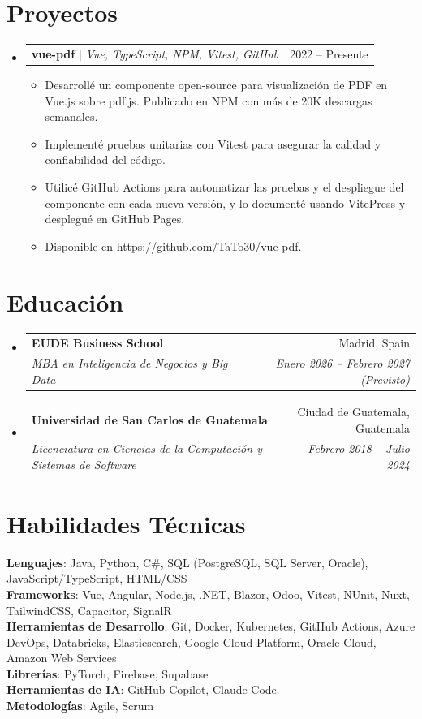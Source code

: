 \documentclass[letterpaper,11pt]{article}
\makeatletter
\newcommand{\resumeItem}[1]{
  \item\small{
    {#1 \vspace{-2pt}}
  }
}
\newcommand{\resumeSubheading}[4]{
  \vspace{-2pt}\item
    \begin{tabular*}{0.97\textwidth}[t]{l@{\extracolsep{\fill}}r}
      \textbf{#1} & #2 \\
      \textit{\small#3} & \textit{\small #4} \\
    \end{tabular*}\vspace{-7pt}
}
\newcommand{\resumeProjectHeading}[2]{
    \item
    \begin{tabular*}{0.97\textwidth}{l@{\extracolsep{\fill}}r}
      \small#1 & #2 \\
    \end{tabular*}\vspace{-7pt}
}
\newcommand{\resumeSubHeadingListStart}{\begin{itemize}[leftmargin=0.15in, label={}]}
\newcommand{\resumeSubHeadingListEnd}{\end{itemize}}
\newcommand{\resumeItemListStart}{\begin{itemize}}
\newcommand{\resumeItemListEnd}{\end{itemize}\vspace{-5pt}}
\makeatother
\begin{document}
\section{Proyectos}
    \resumeSubHeadingListStart
      \resumeProjectHeading
          {\textbf{vue-pdf} $|$ \emph{Vue, TypeScript, NPM, Vitest, GitHub}}{2022 -- Presente}
          \resumeItemListStart
            \resumeItem{Desarrollé un componente open-source para visualización de PDF en Vue.js sobre pdf.js. Publicado en NPM con más de 20K descargas semanales.}
            \resumeItem{Implementé pruebas unitarias con Vitest para asegurar la calidad y confiabilidad del código.}
            \resumeItem{Utilicé GitHub Actions para automatizar las pruebas y el despliegue del componente con cada nueva versión, y lo documenté usando VitePress y desplegué en GitHub Pages.}
            \resumeItem{Disponible en \href{https://github.com/TaTo30/vue-pdf}{https://github.com/TaTo30/vue-pdf}.}
            \resumeItemListEnd
    \resumeSubHeadingListEnd

\section{Educación}
  \resumeSubHeadingListStart
    \resumeSubheading
      {EUDE Business School}{Madrid, Spain}
      {MBA en Inteligencia de Negocios y Big Data}{Enero 2026 -- Febrero 2027 (Previsto)}
    \resumeSubheading
      {Universidad de San Carlos de Guatemala}{Ciudad de Guatemala, Guatemala}
      {Licenciatura en Ciencias de la Computación y Sistemas de Software}{Febrero 2018 -- Julio 2024}
  \resumeSubHeadingListEnd


\section{Habilidades Técnicas}
 \begin{itemize}[leftmargin=0.15in, label={}]
    \small{\item{
    \textbf{Lenguajes}{: Java, Python, C\#, SQL (PostgreSQL, SQL Server, Oracle), JavaScript/TypeScript, HTML/CSS} \\
    \textbf{Frameworks}{: Vue, Angular, Node.js, .NET, Blazor, Odoo, Vitest, NUnit, Nuxt, TailwindCSS, Capacitor, SignalR} \\
    \textbf{Herramientas de Desarrollo}{: Git, Docker, Kubernetes, GitHub Actions, Azure DevOps, Databricks, Elasticsearch, Google Cloud Platform, Oracle Cloud, Amazon Web Services} \\
    \textbf{Librerías}{: PyTorch, Firebase, Supabase} \\
    \textbf{Herramientas de IA}{: GitHub Copilot, Claude Code} \\
    \textbf{Metodologías}{: Agile, Scrum}
    }}
 \end{itemize}

\end{document}
